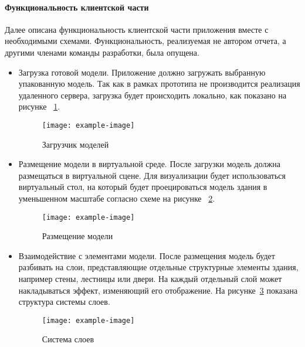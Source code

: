 \paragraph{Функциональность клиентской части}

Далее описана функциональность клиентской части приложения
вместе с необходимыми схемами.
Функциональность, реализуемая не автором отчета,
а другими членами команды разработки, была опущена.

\begin{itemize}
    \item {
        Загрузка готовой модели.
        Приложение должно загружать выбранную упакованную модель.
        Так как в рамках прототипа не производится реализация удаленного сервера,
        загрузка будет происходить локально, как показано на рисунке~%
        \ref{figure:CModelLoader}.

        \begin{figure}[ht]
            \centering
            \texttt{[image: example-image]}
            \caption{Загрузчик моделей}
            \label{figure:CModelLoader}
        \end{figure}

    } 
    \item {
        Размещение модели в виртуальной среде.
        После загрузки модель должна размещаться в виртуальной сцене.
        Для визуализации будет использоваться виртуальный стол,
        на который будет проецироваться модель здания
        в уменьшенном масштабе согласно схеме на рисунке~%
        \ref{figure:CStand}.

        \begin{figure}[ht]
            \centering
            \texttt{[image: example-image]}
            \caption{Размещение модели}
            \label{figure:CStand}
        \end{figure}

    } 
    \item {
        Взаимодействие с элементами модели.
        После размещения модель будет разбивать на слои,
        представляющие отдельные структурные элементы здания,
        например стены, лестницы или двери.
        На каждый отдельный слой может накладываться эффект,
        изменяющий его отображение.
        На рисунке~\ref{figure:CLayers} показана
        структура системы слоев.

        \begin{figure}[ht]
            \centering
            \texttt{[image: example-image]}
            \caption{Система слоев}
            \label{figure:CLayers}
        \end{figure}

    } 
\end{itemize}


